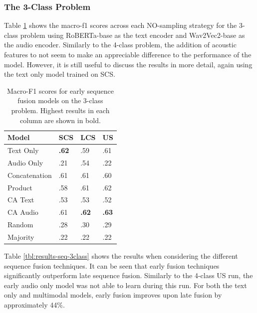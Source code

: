\documentclass[twocolumn]{article}
\begin{document}
\subsubsection{The 3-Class Problem}\label{sec:id-3class}

Table \ref{tbl:results-early-3class} shows the macro-f1 scores across
each NO-sampling strategy for the 3-class problem using RoBERTa-base as
the text encoder and Wav2Vec2-base as the audio encoder. Similarly to
the 4-class problem, the addition of acoustic features to not seem to
make an appreciable difference to the performance of the model. However,
it is still useful to discuss the results in more detail, again using
the text only model trained on SCS.

\begin{table}[h]
\centering
\caption{Macro-F1 scores for early sequence fusion models on the 3-class problem. Highest results in each column are shown in bold.\label{tbl:results-early-3class}}
\begin{tabular}{|l|lll|}
\hline
Model         & SCS          & LCS          & US           \\ \hline
Text Only     & \textbf{.62} & .59          & .61          \\
Audio Only    & .21          & .54          & .22          \\ \hline
Concatenation & .61          & .61          & .60          \\
Product       & .58          & .61          & .62          \\
CA Text       & .53          & .53          & .52          \\
CA Audio      & .61          & \textbf{.62} & \textbf{.63} \\ \hline
Random        & .28          & .30          & .29          \\
Majority      & .22          & .22          & .22          \\ \hline
\end{tabular}
\end{table}

Table \ref{tbl:results-seq-3class} shows the results when considering
the different sequence fusion techniques. It can be seen that early
fusion techniques significantly outperform late sequence fusion.
Similarly to the 4-class US run, the early audio only model was not able
to learn during this run. For both the text only and multimodal models,
early fusion improves upon late fusion by approximately 44\%.
\end{document}
